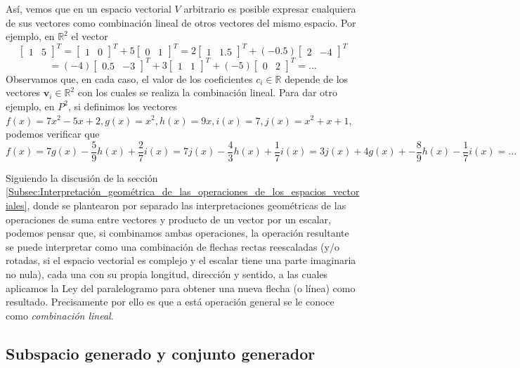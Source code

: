 \documentclass[12pt]{article}
\begin{document}
Así, vemos que en un espacio vectorial $V$ arbitrario es posible expresar cualquiera de sus vectores como combinación lineal de otros vectores del mismo espacio. Por ejemplo, en $\mathbb{R}^2$ el vector $$\begin{bmatrix} 1 & 5 \end{bmatrix}^T = \begin{bmatrix} 1 & 0 \end{bmatrix}^T + 5\begin{bmatrix} 0 & 1 \end{bmatrix}^T = 2\begin{bmatrix} 1 & 1.5 \end{bmatrix}^T + (-0.5)\begin{bmatrix} 2 & -4 \end{bmatrix}^T $$ $$ = (-4)\begin{bmatrix} 0.5 & -3 \end{bmatrix}^T + 3\begin{bmatrix} 1 & 1 \end{bmatrix}^T + (-5)\begin{bmatrix} 0 & 2 \end{bmatrix}^T = ...$$ \noindent Observamos que, en cada caso, el valor de los coeficientes $c_i\in\mathbb{R}$ depende de los vectores $\mathbf{v}_i\in\mathbb{R}^2$ con los cuales se realiza la combinación lineal. Para dar otro ejemplo, en $P^2$, si definimos los vectores $f(x) = 7x^2 - 5x + 2, g(x) = x^2, h(x) = 9x, i(x)=7, j(x)=x^2 + x + 1$, podemos verificar que $$f(x) = 7g(x)-\frac{5}{9}h(x)+\frac{2}{7}i(x)=7j(x)-\frac{4}{3}h(x)+\frac{1}{7}i(x)=3j(x)+4g(x)+-\frac{8}{9}h(x)-\frac{1}{7}i(x)=...$$

Siguiendo la discusión de la sección \ref{Subsec:Interpretación_geométrica_de_las_operaciones_de_los_espacios_vectoriales}, donde se plantearon por separado las interpretaciones geométricas de las operaciones de suma entre vectores y producto de un vector por un escalar, podemos pensar que, si combinamos ambas operaciones, la operación resultante se puede interpretar como una combinación de flechas rectas reescaladas (y/o rotadas, si el espacio vectorial es complejo y el escalar tiene una parte imaginaria no nula), cada una con su propia longitud, dirección y sentido, a las cuales aplicamos la Ley del paralelogramo para obtener una nueva flecha (o línea) como resultado. Precisamente por ello es que a está operación general se le conoce como \emph{combinación lineal}.

\subsection{Subspacio generado y conjunto generador} \label{Espacio_generado_y_conjunto_generador}
\end{document}
